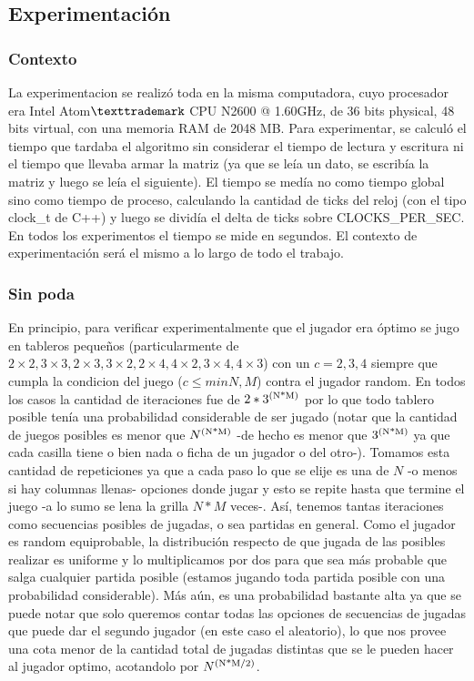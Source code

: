 \documentclass[A4paper,oneside,fleqn,11pt]{article}
\theoremstyle{definition}
\begin{document}
\subsection{Experimentación}

\subsubsection{Contexto} 


La experimentacion se realizó toda en la misma computadora, cuyo procesador era Intel Atom$\texttrademark$ CPU N2600 @ 1.60GHz, de 36 bits physical, 48 bits virtual, con una memoria RAM de 2048 MB.  Para experimentar, se calculó el tiempo que tardaba el algoritmo sin considerar el tiempo de lectura y escritura ni el tiempo que llevaba armar la matriz (ya que se leía un dato, se escribía la matriz y luego se leía el siguiente). 
El tiempo se medía no como tiempo global sino como tiempo de proceso, calculando la cantidad de ticks del reloj (con el tipo clock\_t de C++) y luego se dividía el delta de ticks sobre CLOCKS\_PER\_SEC. En todos los experimentos el tiempo se mide en segundos. El contexto de experimentación será el mismo a lo largo de todo el trabajo.

\subsubsection{Sin poda}
En principio, para verificar experimentalmente que el jugador era óptimo se jugo en tableros pequeños (particularmente de $2\times2, 3\times3, 2\times3, 3\times2, 2\times4, 4\times2, 3\times4, 4\times3$) con un $c=2, 3, 4$ siempre que cumpla la condicion del juego ($c\leq min{N,M}$) contra el jugador random. En todos los casos la cantidad de iteraciones fue de $2*3\textsuperscript{(N*M)}$ por lo que todo tablero posible tenía una probabilidad considerable de ser jugado (notar que la cantidad de juegos posibles es menor que  $N\textsuperscript{(N*M)}$ -de hecho es menor que $3\textsuperscript{(N*M)}$ ya que cada casilla tiene o bien nada o ficha de un jugador o del otro-). Tomamos esta cantidad de repeticiones ya que a cada paso lo que se elije es una de $N$ -o menos si hay columnas llenas- opciones donde jugar y esto se repite hasta que termine el juego -a lo sumo se lena la grilla $N*M$ veces-. Así, tenemos tantas iteraciones como secuencias posibles de jugadas, o sea partidas en general. Como el jugador es random equiprobable, la distribución respecto de que jugada de las posibles realizar es uniforme y lo multiplicamos por dos para que sea más probable que salga cualquier partida posible (estamos jugando toda partida posible con una probabilidad considerable). Más aún, es una probabilidad bastante alta ya que se puede notar que solo queremos contar todas las opciones de secuencias de jugadas que puede dar el segundo jugador (en este caso el aleatorio), lo que nos provee una cota menor de la cantidad total de jugadas distintas que se le pueden hacer al jugador optimo, acotandolo por $N\textsuperscript{(N*M/2)}$. 
\end{document}
